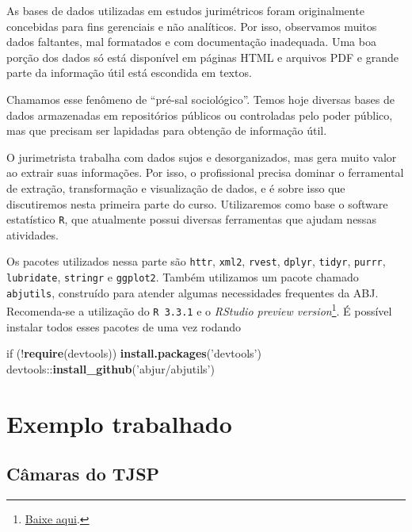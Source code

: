 \documentclass[]{book}
\newenvironment{Shaded}{\begin{snugshade}}{\end{snugshade}}
\newcommand{\KeywordTok}[1]{\textcolor[rgb]{0.13,0.29,0.53}{\textbf{{#1}}}}
\newcommand{\StringTok}[1]{\textcolor[rgb]{0.31,0.60,0.02}{{#1}}}
\newcommand{\NormalTok}[1]{{#1}}
\let\rmarkdownfootnote\footnote%
\def\footnote{\protect\rmarkdownfootnote}
\begin{document}
As bases de dados utilizadas em estudos jurimétricos foram originalmente
concebidas para fins gerenciais e não analíticos. Por isso, observamos
muitos dados faltantes, mal formatados e com documentação inadequada.
Uma boa porção dos dados só está disponível em páginas HTML e arquivos
PDF e grande parte da informação útil está escondida em textos.

Chamamos esse fenômeno de ``pré-sal sociológico''. Temos hoje diversas
bases de dados armazenadas em repositórios públicos ou controladas pelo
poder público, mas que precisam ser lapidadas para obtenção de
informação útil.

O jurimetrista trabalha com dados sujos e desorganizados, mas gera muito
valor ao extrair suas informações. Por isso, o profissional precisa
dominar o ferramental\\
de extração, transformação e visualização de dados, e é sobre isso que
discutiremos nesta primeira parte do curso. Utilizaremos como base o
software estatístico \texttt{R}, que atualmente possui diversas
ferramentas que ajudam nessas atividades.

Os pacotes utilizados nessa parte são \texttt{httr}, \texttt{xml2},
\texttt{rvest}, \texttt{dplyr}, \texttt{tidyr}, \texttt{purrr},
\texttt{lubridate}, \texttt{stringr} e \texttt{ggplot2}. Também
utilizamos um pacote chamado \texttt{abjutils}, construído para atender
algumas necessidades frequentes da ABJ. Recomenda-se a utilização do
\texttt{R\ 3.3.1} e o \emph{RStudio preview version}\footnote{\href{https://www.rstudio.com/products/rstudio/download/preview/}{Baixe
  aqui}.}. É possível instalar todos esses pacotes de uma vez rodando

\begin{Shaded}
\begin{Highlighting}[]
\NormalTok{if (!}\KeywordTok{require}\NormalTok{(devtools)) }\KeywordTok{install.packages}\NormalTok{(}\StringTok{'devtools'}\NormalTok{)}
\NormalTok{devtools::}\KeywordTok{install_github}\NormalTok{(}\StringTok{'abjur/abjutils'}\NormalTok{)}
\end{Highlighting}
\end{Shaded}

\section{Exemplo trabalhado}\label{exemplo-trabalhado}

\subsection{Câmaras do TJSP}\label{camaras-do-tjsp}
\end{document}
